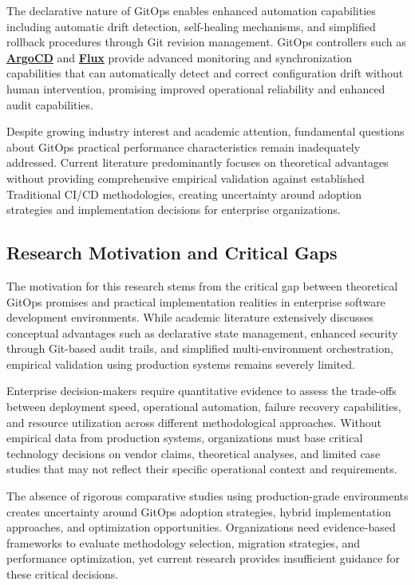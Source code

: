 The declarative nature of GitOps enables enhanced automation capabilities including automatic drift detection, self-healing mechanisms, and simplified rollback procedures through Git revision management. GitOps controllers such as \textbf{\hyperref[argo_cd_docs]{ArgoCD}} and \textbf{\hyperref[flux2023]{Flux}} provide advanced monitoring and synchronization capabilities that can automatically detect and correct configuration drift without human intervention, promising improved operational reliability and enhanced audit capabilities.

Despite growing industry interest and academic attention, fundamental questions about GitOps practical performance characteristics remain inadequately addressed. Current literature predominantly focuses on theoretical advantages without providing comprehensive empirical validation against established Traditional CI/CD methodologies, creating uncertainty around adoption strategies and implementation decisions for enterprise organizations.

\subsection{Research Motivation and Critical Gaps}
The motivation for this research stems from the critical gap between theoretical GitOps promises and practical implementation realities in enterprise software development environments. While academic literature extensively discusses conceptual advantages such as declarative state management, enhanced security through Git-based audit trails, and simplified multi-environment orchestration, empirical validation using production systems remains severely limited.

Enterprise decision-makers require quantitative evidence to assess the trade-offs between deployment speed, operational automation, failure recovery capabilities, and resource utilization across different methodological approaches. Without empirical data from production systems, organizations must base critical technology decisions on vendor claims, theoretical analyses, and limited case studies that may not reflect their specific operational context and requirements.

The absence of rigorous comparative studies using production-grade environments creates uncertainty around GitOps adoption strategies, hybrid implementation approaches, and optimization opportunities. Organizations need evidence-based frameworks to evaluate methodology selection, migration strategies, and performance optimization, yet current research provides insufficient guidance for these critical decisions.

